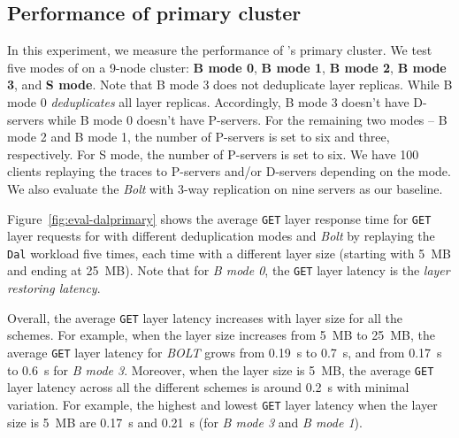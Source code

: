 


\subsection{Performance of primary cluster }
In this experiment,
we measure the performance of \sysname's primary cluster.
%
We test five modes of \sysname on a 9-node cluster:
\textbf{B mode 0},
\textbf{B mode 1},
\textbf{B mode 2},
\textbf{B mode 3}, and
\textbf{S mode}.
Note that B mode 3 does not deduplicate layer replicas.
While B mode 0 \emph{deduplicates} all layer replicas. 
Accordingly, B mode 3 doesn't have D-servers while
B mode 0 doesn't have P-servers.
%
For the remaining two modes --
B mode 2 and B mode 1, the number of P-servers is set to six and three, respectively. For S mode, the number of P-servers is set to six.
We have 100 clients replaying the traces to P-servers and/or D-servers depending on the mode.
We also evaluate the \emph{Bolt} with 3-way replication on nine servers as our baseline. 

Figure~\ref{fig:eval-dalprimary} shows the average \texttt{GET} layer response time for \texttt{GET} layer requests for \sysname with different deduplication modes and \emph{Bolt} by replaying the \texttt{Dal} workload five times, each time with a different layer size (starting with 5~MB and ending at 25~MB).
Note that for \emph{B mode 0}, the \texttt{GET} layer latency is the \emph{layer restoring latency}.


Overall, the average \texttt{GET} layer latency increases with layer size for all the schemes.
For example, when the layer size increases from 5~MB to 25~MB, the average \texttt{GET} layer latency for \emph{BOLT} grows from 0.19~s to 0.7~s, and from 0.17~s to 0.6~s for \emph{B mode 3}.
Moreover, when the layer size is 5~MB, the average \texttt{GET} layer latency across all the different schemes is around 0.2~s with minimal variation.
For example, the highest and lowest \texttt{GET} layer latency when the layer size is 5~MB are 0.17~s and 0.21~s (for \emph{B mode 3} and \emph{B mode 1}).

